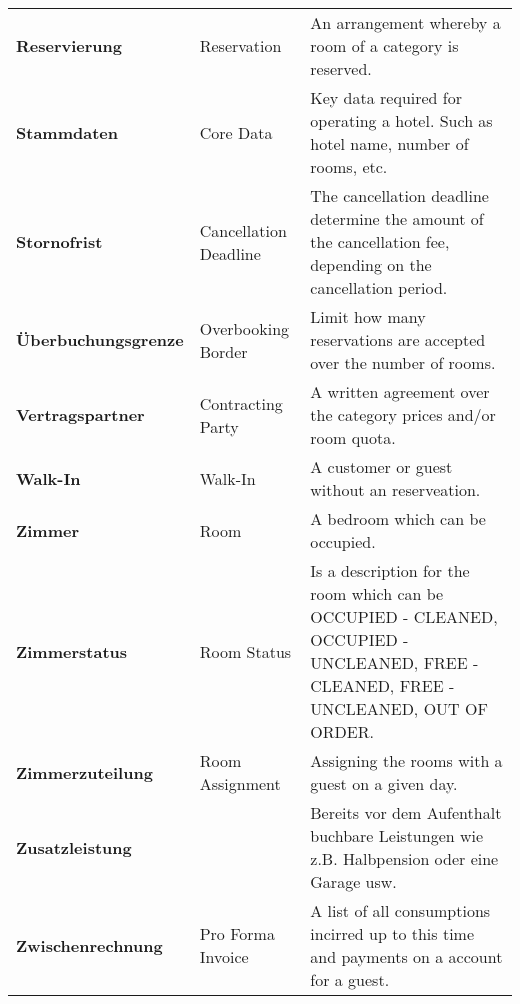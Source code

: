 \documentclass[../Pflichtenheft.tex]{subfiles}
\begin{document}
\begin{longtable}{p{4cm} p{4cm} p{6cm}}
        \textbf{Reservierung} & {Reservation} & An arrangement whereby a room of a category is reserved. \\[0.5cm]
        \textbf{Stammdaten} & {Core Data} & Key data required for operating a hotel. Such as hotel name, number of rooms, etc. \\[0.5cm]
        \textbf{Stornofrist} & {Cancellation Deadline} & The cancellation deadline determine the amount of the cancellation fee, depending on the cancellation period. \\[0.5cm]
        \textbf{Überbuchungsgrenze} & {Overbooking Border} & Limit how many reservations are accepted over the number of rooms. \\[0.5cm]
        \textbf{Vertragspartner} & {Contracting Party} & A written agreement over the category prices and/or room quota. \\[0.5cm]
        \textbf{Walk-In} & {Walk-In} & A customer or guest without an reserveation. \\[0.5cm]
        \textbf{Zimmer} & {Room} & A bedroom which can be occupied. \\[0.5cm]
        \textbf{Zimmerstatus} & {Room Status} & Is a description for the room which can be OCCUPIED - CLEANED, OCCUPIED - UNCLEANED, FREE - CLEANED, FREE - UNCLEANED, OUT OF ORDER. \\[0.5cm]
		\textbf{Zimmerzuteilung} & {Room Assignment} & Assigning the rooms with a guest on a given day. \\[0.5cm]
        \textbf{Zusatzleistung} & & Bereits vor dem Aufenthalt buchbare Leistungen wie z.B. Halbpension oder eine Garage usw.\\[0.5cm]
        \textbf{Zwischenrechnung} & {Pro Forma Invoice} & A list of all consumptions incirred up to this time and payments on a account for a guest. \\[0.5cm]
		\end{longtable}
\end{document}
